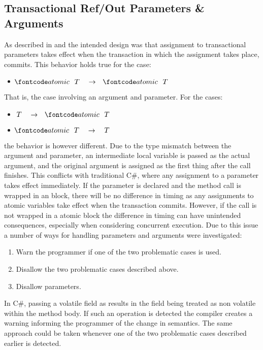 \subsection{Transactional Ref/Out Parameters \& Arguments}\label{subsec:roslyn_extension_ref_out_revisited}
As described in  and  the intended design was that assignment to transactional  parameters takes effect when the transaction in which the assignment takes place, commits. This behavior holds true for the case:
\begin{itemize}
	\item $\bscode{atomic} \quad T \quad \rightarrow \quad \bscode{atomic} \quad T$
\end{itemize}
That is, the case involving an  argument and parameter. For the cases:
\begin{itemize}
	\item $T \quad \rightarrow \quad \bscode{atomic} \quad T$
	\item $\bscode{atomic} \quad T \quad \rightarrow \quad T$
\end{itemize}
the behavior is however different. Due to the type mismatch between the argument and parameter, an intermediate local variable is passed as the actual argument, and the original argument is assigned as the first thing after the call finishes. This conflicts with traditional C\#, where any assignment to a  parameter takes effect immediately\cite[p. 76]{sestoft2011c}. If the parameter is declared  and the method call is wrapped in an  block, there will be no difference in timing as any assignments to atomic variables take effect when the transaction commits. However, if the call is not wrapped in a atomic block the difference in timing can have unintended consequences, especially when considering concurrent execution. Due to this issue a number of ways for handling  parameters and arguments were investigated:
\begin{enumerate}
	\item Warn the programmer if one of the two problematic cases is used.
	\item Disallow the two problematic cases described above.
	\item Disallow  parameters.
\end{enumerate}
In C\#, passing a volatile field as  results in the field being treated as non volatile within the method body\cite{csharpVolatileRef}. If such an operation is detected the compiler creates a warning informing the programmer of the change in semantics. The same approach could be taken whenever one of the two problematic cases described earlier is detected.

